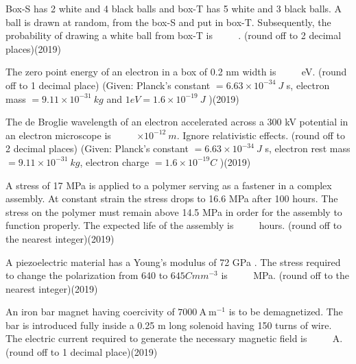     \item Box-S has 2 white and 4 black balls and box-T has 5 white and 3 black balls. A ball is drawn at random, from the box-S and put in box-T. Subsequently, the probability of drawing a white ball from box-T is $\qquad$ . (round off to 2 decimal places)\hfill{(2019)}

    \item The zero point energy of an electron in a box of 0.2 nm width is $\qquad$ eV.
(round off to 1 decimal place)
(Given: Planck's constant $=6.63 \times 10^{-34} {~J}$ s, electron mass $=9.11 \times 10^{-31} {~kg}$ and $1 {eV}=1.6 \times 10^{-19} {~J}$ )\hfill{(2019)}


\item The de Broglie wavelength of an electron accelerated across a 300 kV potential in an electron microscope is $\qquad$ $\times 10^{-12} {~m}$. Ignore relativistic effects. (round off to 2 decimal places)
(Given: Planck's constant $=6.63 \times 10^{-34} {~J}$ s, electron rest mass $=9.11 \times 10^{-31} {~kg}$, electron charge $=1.6 \times 10^{-19} {C}$ )\hfill{(2019)}

     
    \item  A stress of 17 MPa is applied to a polymer serving as a fastener in a complex assembly. At constant strain the stress drops to 16.6 MPa after 100 hours. The stress on the polymer must remain above 14.5 MPa in order for the assembly to function properly. The expected life of the assembly is $\qquad$ hours. (round off to the nearest integer)\hfill{(2019)}

    
    

    \item  A piezoelectric material has a Young's modulus of 72 GPa . The stress required to change the polarization from 640 to $645 {C} {m} {m}^{-3}$ is $\qquad$ MPa. (round off to the nearest integer)\hfill{(2019)}

    \item  An iron bar magnet having coercivity of $7000 \mathrm{~A} \mathrm{~m}^{-1}$ is to be demagnetized. The bar is introduced fully inside a 0.25 m long solenoid having 150 turns of wire. The electric current required to generate the necessary magnetic field is $\qquad$ A. (round off to 1 decimal place)\hfill{(2019)}


        

